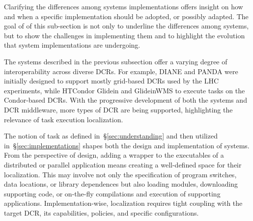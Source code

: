 \documentclass{sig-alternate}
\begin{document}
Clarifying the differences among \pilot systems implementations offers insight
on how and when a specific implementation should be adopted, or possibly
adapted.  The goal of of this sub-section  is not only to underline the differences among
\pilot systems, but to show the challenges in implementing them and to highlight
the evolution that \pilot system implementations are undergoing.  




The \pilot systems described in the previous subsection offer a varying degree
of interoperability across diverse DCRs. For example, DIANE and PANDA were
initially designed to support mostly grid-based DCRs used by the LHC
experiments, while HTCondor Glidein and GlideinWMS to execute tasks on the
Condor-based DCRs. With the progressive development of both the \pilot systems
and DCR middleware, more types of DCR are being supported, highlighting the
relevance of task execution localization. 



The notion of task as defined in~\S\ref{sec:understanding} and then utilized
in~\S\ref{sec:implementations} shapes both the design and implementation of
\pilot systems. From the perspective of design, adding a wrapper to the
executables of a distributed or parallel application means creating a
well-defined space for their localization. This may involve not only the
specification of program switches, data locations, or library dependences but
also loading modules, downloading supporting code, or on-the-fly compilations
and execution of supporting applications. Implementation-wise, localization
requires tight coupling with the target DCR, its capabilities, policies, and
specific configurations.
\end{document}
